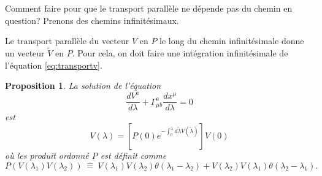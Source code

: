 \documentclass[a4paper,11pt]{report}
\theoremstyle{definition}
\theoremstyle{plain}
\newtheorem{prop}[thm]{Proposition}
\theoremstyle{definition}
\theoremstyle{remark}
\begin{document}
                Comment faire pour que le transport parallèle ne dépende pas du chemin en question? Prenons des chemins infinitésimaux.
                
                Le transport parallèle du vecteur $V$ en $P$ le long du chemin infinitésimale donne un vecteur $\widetilde{V}$ en $P$. Pour cela, on doit faire une intégration infinitésimale de l'équation \ref{eq:transportv}.
                
                \begin{prop}
                    La solution de l'équation
                    \begin{equation}
                        \frac{dV^a}{d\lambda} + \Gamma^a_{\mu b}\frac{dx^\mu}{d\lambda} = 0
                    \end{equation}
                    est 
                    \begin{equation}
                        V(\lambda) = \left[P(0)e^{-\int_0^\lambda d\widetilde{\lambda}V(\widetilde{\lambda})}\right]V(0)
                    \end{equation}
                    où les \textit{produit ordonné} $P$ est définit comme
                    \begin{equation}
                        P\left(V(\lambda_1)V(\lambda_2)\right) ~\hat{=}~ V(\lambda_1) V(\lambda_2)\theta(\lambda_1-\lambda_2)+V(\lambda_2) V(\lambda_1)\theta(\lambda_2-\lambda_1).
                    \end{equation}
                \end{prop}
                
\end{document}

